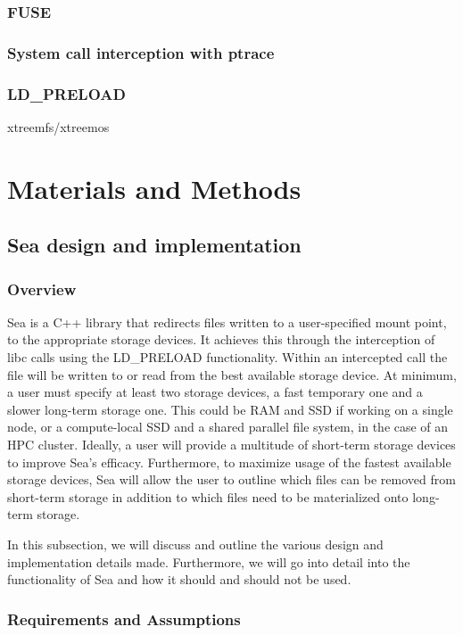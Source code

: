 \documentclass[10pt,journal,compsoc]{IEEEtran}
\begin{document}
\subsubsection{FUSE}
\subsubsection{System call interception with ptrace}
\subsubsection{LD\_PRELOAD}
xtreemfs/xtreemos

\section{Materials and Methods}

\subsection{Sea design and implementation}
\subsubsection{Overview}

Sea is a C++ library that redirects files written to a user-specified mount point, to the
appropriate storage devices. It achieves this through the interception of libc calls using
the LD\_PRELOAD functionality. Within an intercepted call the file will be written to or read
from the best available storage device. At minimum, a user must specify at least two storage devices, a fast
temporary one and a slower long-term storage one. This could be RAM and SSD if working on a single node, or a compute-local SSD
and a shared parallel file system, in the case of an HPC cluster. Ideally, a user will provide a multitude of short-term storage
devices to improve Sea's efficacy. Furthermore, to maximize usage of the fastest available
storage devices, Sea will allow the user to outline which files can be removed from short-term storage in addition
to which files need to be materialized onto long-term storage.

In this subsection, we will discuss and outline the various design and implementation details made. Furthermore,
we will go into detail into the functionality of Sea and how it should and should not be used.

\subsubsection{Requirements and Assumptions}
\end{document}

